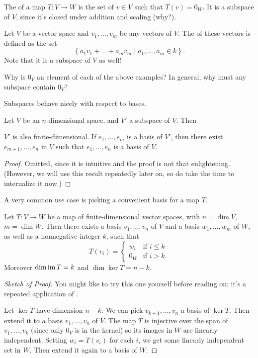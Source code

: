 \begin{example}[Kernels]
	The  of a map $T \colon V \to W$ is the
	set of $v \in V$ such that $T(v) = 0_W$.
	It is a subspace of $V$, since it's closed under addition and scaling (why?).
\end{example}
\begin{example}[Spans]
	Let $V$ be a vector space and $v_1, \dots, v_m$ be any vectors of $V$.
	The  of these vectors is defined as the set
	\[ \left\{ a_1 v_1 + \dots + a_m v_m \mid a_1, \dots, a_m \in k \right\}. \]
	Note that it is a subspace of $V$ as well!
\end{example}
\begin{ques}
	Why is $0_V$ an element of each of the above examples?
	In general, why must any subspace contain $0_V$?
\end{ques}

Subspaces behave nicely with respect to bases.
\begin{theorem}
	\label{thm:basis_completion}
	Let $V$ be an $n$-dimensional space, and $V'$ a subspace of $V$.
	Then
	\begin{enumerate}[(a)]
		\ii $V'$ is also finite-dimensional.
		\ii If $e_1, \dots, e_m$ is a basis of $V'$, then there exist
		$e_{m+1}, \dots, e_n$ in $V$ such that
		$e_1, \dots, e_n$ is a basis of $V$.
	\end{enumerate}
\end{theorem}
\begin{proof}
	Omitted, since it is intuitive and the proof is not that enlightening.
	(However, we will use this result repeatedly later on,
	so do take the time to internalize it now.)
\end{proof}

A very common use case is picking a convenient basis for a map $T$.
\begin{theorem}
	\label{thm:linear_map_basis}
	Let $T \colon V \to W$ be a map of finite-dimensional vector spaces,
	with $n = \dim V$, $m = \dim W$.
	Then there exists a basis $v_1, \dots, v_n$ of $V$
	and a basis $w_1, \dots, w_m$ of $W$,
	as well as a nonnegative integer $k$, such that
	\[
		T(v_i) =
		\begin{cases}
			w_i & \text{if $i \le k$} \\
			0_W & \text{if $i > k$}.
		\end{cases}
	\]
	Moreover $\dim \operatorname{im} T = k$ and $\dim \ker T = n-k$.
\end{theorem}
\begin{proof}[Sketch of Proof]
	You might like to try this one yourself before reading on:
	it's a repeated application of .

	Let $\ker T$ have dimension $n-k$.
	We can pick $v_{k+1}, \dots, v_{n}$ a basis of $\ker T$.
	Then extend it to a basis $v_1, \dots, v_n$ of $V$.
	The map $T$ is injective over the span of $v_1, \dots, v_k$
	(since only $0_V$ is in the kernel) so its images in $W$ are linearly independent.
	Setting $w_i = T(v_i)$ for each $i$,
	we get some linearly independent set in $W$.
	Then extend it again to a basis of $W$.
\end{proof}

